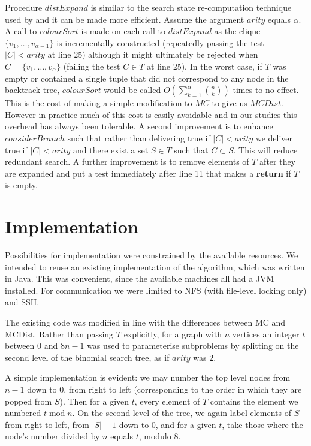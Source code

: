 \documentclass{l4proj}
\DeclareMathOperator{\mod}{mod}
\begin{document}
Procedure $distExpand$ is similar to the search state re-computation technique used by \cite{perron1999} and it 
can be made more efficient. Assume the argument $arity$ equals $\alpha$. A call to $colourSort$ is made on each call to $distExpand$
as the clique $\{v_{1},\ldots,v_{\alpha-1}\}$ is incrementally constructed (repeatedly passing the test $|C| < arity$ at line 25) 
although it might ultimately be rejected when $C = \{v_{1},\ldots,v_{\alpha}\}$
(failing the test $C \in T$ at line 25). In the worst case, if $T$ was empty or contained a single tuple that did not correspond 
to any node in the backtrack tree, $colourSort$ would be called $O(\sum_{k=1}^{\alpha}{n \choose k})$ times to no effect. 
This is the cost of making a simple modification to $MC$ to give us $MCDist$. However in practice much of this cost is easily avoidable and
in our studies this overhead has always been tolerable. A second improvement is to enhance $considerBranch$ such that rather than 
delivering true if $|C| <  arity$ we deliver true if $|C| < arity$ and there exist a set $S \in T$ such that $C \subset S$. 
This will reduce redundant search. A further improvement is to remove elements of $T$ after they are expanded and put a test immediately
after line 11 that makes a {\bf return} if $T$ is empty.

%
\chapter{Implementation}
Possibilities for implementation were constrained by the available resources.
We intended to reuse an existing implementation of the algorithm, which was
written in Java. This was convenient, since the available machines all had a
JVM installed. For communication we were limited to NFS (with file-level
locking only) and SSH.

The existing code was modified in line with the differences between MC and
MCDist. Rather than passing $T$ explicitly, for a graph with $n$ vertices an integer
$t$ between $0$ and $8n-1$ was used to parameterise subproblems by splitting on
the second level of the binomial search tree, as if $arity$ was $2$.

A simple implementation is evident: we may number the top level nodes from
$n-1$ down to $0$, from right to left (corresponding to the order in which they
are popped from $S$). Then for a given $t$, every element of $T$ contains the
element we numbered $t \mod n$. On the second level of the tree, we again label
elements of $S$ from right to left, from $|S|-1$ down to $0$, and for a given
$t$, take those where the node's number divided by $n$ equals $t$, modulo $8$.
\end{document}
